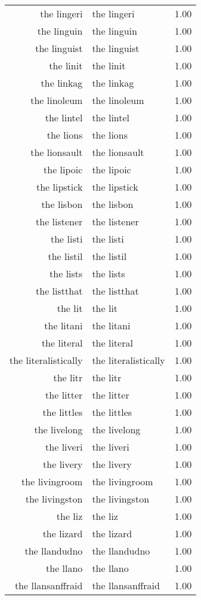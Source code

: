 \begin{table}[ht]
\begin{tabular}{rlr}
  the lingeri & the lingeri & 1.00 \\ 
  the linguin & the linguin & 1.00 \\ 
  the linguist & the linguist & 1.00 \\ 
  the linit & the linit & 1.00 \\ 
  the linkag & the linkag & 1.00 \\ 
  the linoleum & the linoleum & 1.00 \\ 
  the lintel & the lintel & 1.00 \\ 
  the lions & the lions & 1.00 \\ 
  the lionsault & the lionsault & 1.00 \\ 
  the lipoic & the lipoic & 1.00 \\ 
  the lipstick & the lipstick & 1.00 \\ 
  the lisbon & the lisbon & 1.00 \\ 
  the listener & the listener & 1.00 \\ 
  the listi & the listi & 1.00 \\ 
  the listil & the listil & 1.00 \\ 
  the lists & the lists & 1.00 \\ 
  the listthat & the listthat & 1.00 \\ 
  the lit & the lit & 1.00 \\ 
  the litani & the litani & 1.00 \\ 
  the literal & the literal & 1.00 \\ 
  the literalistically & the literalistically & 1.00 \\ 
  the litr & the litr & 1.00 \\ 
  the litter & the litter & 1.00 \\ 
  the littles & the littles & 1.00 \\ 
  the livelong & the livelong & 1.00 \\ 
  the liveri & the liveri & 1.00 \\ 
  the livery & the livery & 1.00 \\ 
  the livingroom & the livingroom & 1.00 \\ 
  the livingston & the livingston & 1.00 \\ 
  the liz & the liz & 1.00 \\ 
  the lizard & the lizard & 1.00 \\ 
  the llandudno & the llandudno & 1.00 \\ 
  the llano & the llano & 1.00 \\ 
  the llansanffraid & the llansanffraid & 1.00 \\ 

\end{tabular}
\end{table}

